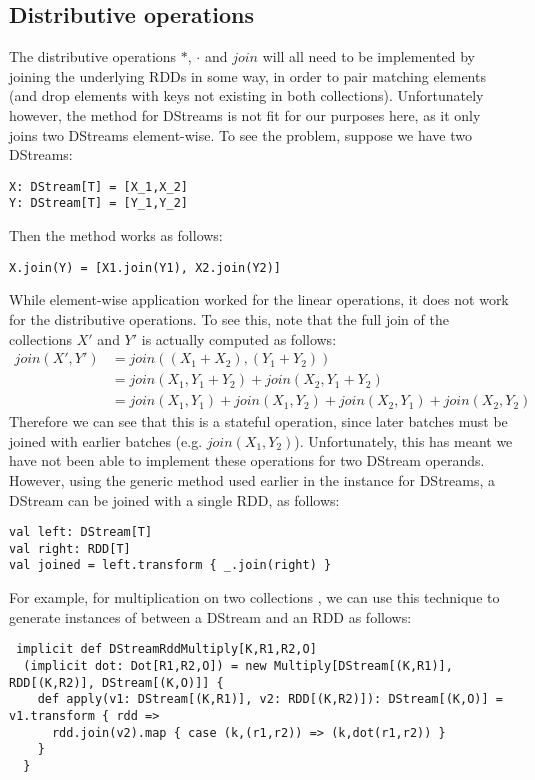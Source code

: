 \subsection{Distributive operations}
The distributive operations $*$, $\cdot$ and $join$ will all need to be implemented by joining the underlying RDDs in some way, in order to pair matching elements (and drop elements with keys not existing in both collections). Unfortunately however, the  method for DStreams is not fit for our purposes here, as it only joins two DStreams element-wise. To see the problem, suppose we have two DStreams:
\begin{lstlisting}
X: DStream[T] = [X_1,X_2] 
Y: DStream[T] = [Y_1,Y_2]
\end{lstlisting}
Then the  method works as follows:
\begin{lstlisting}
X.join(Y) = [X1.join(Y1), X2.join(Y2)]
\end{lstlisting}
While element-wise application worked for the linear operations, it does not work for the distributive operations. To see this, note that the full join of the collections $X'$ and $Y'$ is actually computed as follows:
\begin{equation*}
\begin{split}
join(X',Y') &= join((X_1 + X_2),(Y_1 + Y_2)) \\
&= join(X_1,Y_1 + Y_2) + join(X_2,Y_1 + Y_2) \\
&= join(X_1,Y_1) + join(X_1,Y_2) + join(X_2,Y_1) + join(X_2,Y_2)
\end{split}
\end{equation*}
Therefore we can see that this is a stateful operation, since later batches must be joined with earlier batches (e.g. $join(X_1,Y_2)$). Unfortunately, this has meant we have not been able to implement these operations for two DStream operands. However, using the generic  method used earlier in the  instance for DStreams, a DStream can be joined with a single RDD, as follows:
\vs\begin{lstlisting}
val left: DStream[T]
val right: RDD[T]
val joined = left.transform { _.join(right) }
\end{lstlisting}\vs
For example, for multiplication on two collections , we can use this technique to generate instances of  between a DStream and an RDD as follows:
\vs\begin{lstlisting}
 implicit def DStreamRddMultiply[K,R1,R2,O]
  (implicit dot: Dot[R1,R2,O]) = new Multiply[DStream[(K,R1)], RDD[(K,R2)], DStream[(K,O)]] {
    def apply(v1: DStream[(K,R1)], v2: RDD[(K,R2)]): DStream[(K,O)] = v1.transform { rdd =>
      rdd.join(v2).map { case (k,(r1,r2)) => (k,dot(r1,r2)) }
    }
  }
\end{lstlisting}\vs
